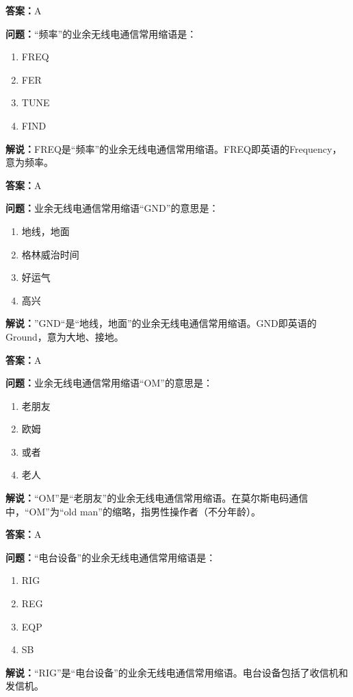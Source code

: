 \documentclass[UTF8]{ctexbook}
\begin{document}
\textbf{答案：}A

\textbf{问题：}“频率”的业余无线电通信常用缩语是：
\begin{enumerate}[label=\Alph*), leftmargin=3em]
  \item FREQ
  \item FER
  \item TUNE
  \item FIND
\end{enumerate}

\textbf{解说：}FREQ是“频率”的业余无线电通信常用缩语。FREQ即英语的Frequency，意为频率。

\textbf{答案：}A

\textbf{问题：}业余无线电通信常用缩语“GND”的意思是：

\begin{enumerate}[label=\Alph*), leftmargin=3em]
  \item 地线，地面
  \item 格林威治时间
  \item 好运气
  \item 高兴
\end{enumerate}

\textbf{解说：}”GND“是“地线，地面”的业余无线电通信常用缩语。GND即英语的Ground，意为大地、接地。

\textbf{答案：}A

\textbf{问题：}业余无线电通信常用缩语“OM”的意思是：

\begin{enumerate}[label=\Alph*), leftmargin=3em]
  \item 老朋友
  \item 欧姆
  \item 或者
  \item 老人
\end{enumerate}

\textbf{解说：}“OM”是“老朋友”的业余无线电通信常用缩语。在莫尔斯电码通信中，“OM”为“old man”的缩略，指男性操作者（不分年龄）。

\textbf{答案：}A

\textbf{问题：}“电台设备”的业余无线电通信常用缩语是：

\begin{enumerate}[label=\Alph*), leftmargin=3em]
  \item RIG
  \item REG
  \item EQP
  \item SB
\end{enumerate}

\textbf{解说：}“RIG”是“电台设备”的业余无线电通信常用缩语。电台设备包括了收信机和发信机。
\end{document}
